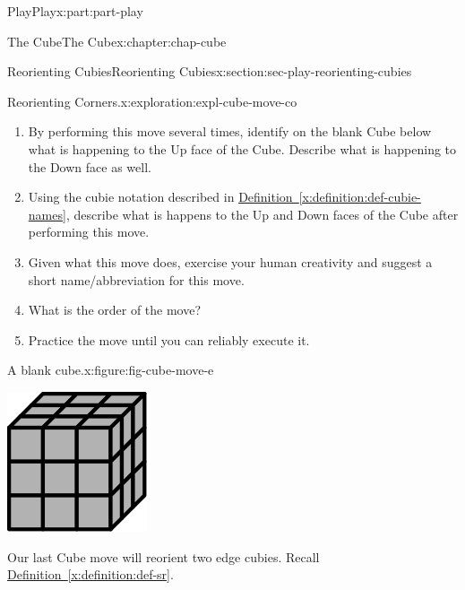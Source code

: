 \documentclass[oneside,10pt,]{book}
\newcommand{\xreffont}{\relax}
\numberwithin{equation}{section}
\begin{document}
\begin{partptx}{Play}{}{Play}{}{}{x:part:part-play}
\begin{chapterptx}{The Cube}{}{The Cube}{}{}{x:chapter:chap-cube}
\begin{sectionptx}{Reorienting Cubies}{}{Reorienting Cubies}{}{}{x:section:sec-play-reorienting-cubies}
\begin{exploration}{Reorienting Corners.}{x:exploration:expl-cube-move-co}
\begin{enumerate}
\item{}By performing this move several times, identify on the blank Cube below what is happening to the Up face of the Cube. Describe what is happening to the Down face as well.%
\item{}Using the cubie notation described in \hyperref[x:definition:def-cubie-names]{Definition~{\xreffont\ref{x:definition:def-cubie-names}}}, describe what is happens to the Up and Down faces of the Cube after performing this move.%
\item{}Given what this move does, exercise your human creativity and suggest a short name\slash{}abbreviation for this move.%
\item{}What is the order of the move?%
\item{}Practice the move until you can reliably execute it.%
\end{enumerate}
\begin{figureptx}{A blank cube.}{x:figure:fig-cube-move-e}{}%
\begin{image}{0.25}{0.5}{0.25}%
\includegraphics[width=\linewidth]{./images/grey_cube.svg}
\end{image}%
\tcblower
\end{figureptx}%
\end{exploration}%
Our last Cube move will reorient two edge cubies. Recall \hyperref[x:definition:def-sr]{Definition~{\xreffont\ref{x:definition:def-sr}}}.%

\end{sectionptx}
\end{chapterptx}
\end{partptx}
\end{document}
